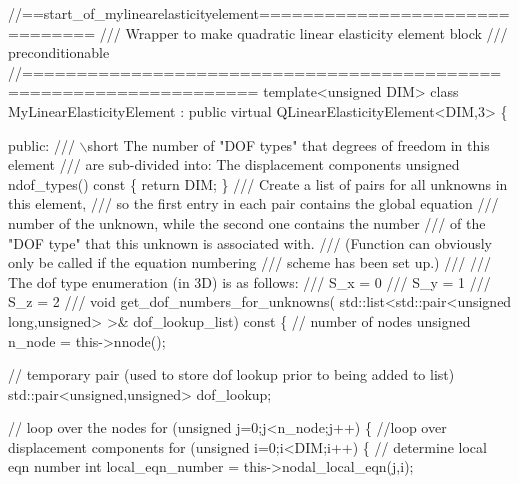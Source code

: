  
\begin{DoxyCodeInclude}
\textcolor{comment}{//==start\_of\_mylinearelasticityelement===============================}
\textcolor{comment}{/// Wrapper to make quadratic linear elasticity element block}
\textcolor{comment}{}\textcolor{comment}{/// preconditionable }
\textcolor{comment}{}\textcolor{comment}{//===================================================================}
\textcolor{keyword}{template}<\textcolor{keywordtype}{unsigned} DIM>
\textcolor{keyword}{class }MyLinearElasticityElement : \textcolor{keyword}{public} \textcolor{keyword}{virtual} QLinearElasticityElement<DIM,3>
\{
 
\textcolor{keyword}{public}: 
\textcolor{comment}{}
\textcolor{comment}{ /// \(\backslash\)short The number of "DOF types" that degrees of freedom in this element}
\textcolor{comment}{ /// are sub-divided into: The displacement components}
\textcolor{comment}{} \textcolor{keywordtype}{unsigned} ndof\_types()\textcolor{keyword}{ const}
\textcolor{keyword}{  }\{
   \textcolor{keywordflow}{return} DIM;
  \}
 \textcolor{comment}{}
\textcolor{comment}{/// Create a list of pairs for all unknowns in this element,}
\textcolor{comment}{/// so the first entry in each pair contains the global equation}
\textcolor{comment}{/// number of the unknown, while the second one contains the number}
\textcolor{comment}{/// of the "DOF type" that this unknown is associated with.}
\textcolor{comment}{/// (Function can obviously only be called if the equation numbering}
\textcolor{comment}{/// scheme has been set up.)}
\textcolor{comment}{/// }
\textcolor{comment}{/// The dof type enumeration (in 3D) is as follows:}
\textcolor{comment}{/// S\_x = 0}
\textcolor{comment}{/// S\_y = 1}
\textcolor{comment}{/// S\_z = 2}
\textcolor{comment}{/// }
\textcolor{comment}{} \textcolor{keywordtype}{void} get\_dof\_numbers\_for\_unknowns(
  std::list<std::pair<unsigned long,unsigned> >& dof\_lookup\_list)\textcolor{keyword}{ const}
\textcolor{keyword}{  }\{
   \textcolor{comment}{// number of nodes}
   \textcolor{keywordtype}{unsigned} n\_node = this->nnode();
   
   \textcolor{comment}{// temporary pair (used to store dof lookup prior to being added to list)}
   std::pair<unsigned,unsigned> dof\_lookup;
   
   \textcolor{comment}{// loop over the nodes}
   \textcolor{keywordflow}{for} (\textcolor{keywordtype}{unsigned} j=0;j<n\_node;j++)
    \{
     \textcolor{comment}{//loop over displacement components}
     \textcolor{keywordflow}{for} (\textcolor{keywordtype}{unsigned} i=0;i<DIM;i++)
      \{
       \textcolor{comment}{// determine local eqn number}
       \textcolor{keywordtype}{int} local\_eqn\_number = this->nodal\_local\_eqn(j,i);
       

\end{DoxyCodeInclude}
